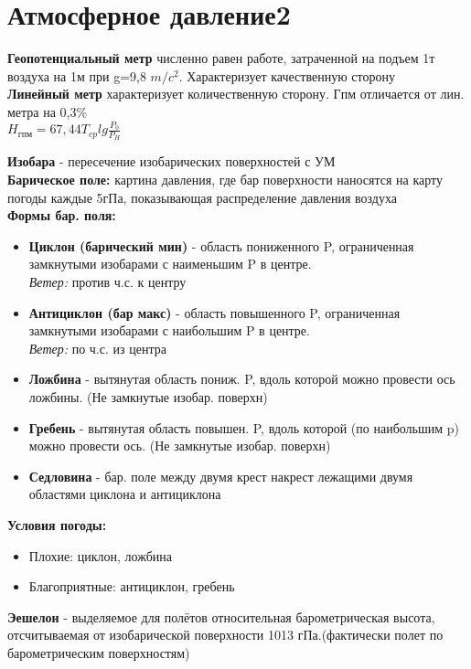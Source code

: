 
\section{Атмосферное давление2}
\par \textbf{Геопотенциальный метр} численно равен работе, затраченной на подъем 1т воздуха на 1м при g=9,8 $m/c^2$. Характеризует качественную сторону\\ 
\textbf{Линейный метр} характеризует количественную сторону. 
Гпм отличается от лин. метра на 0,3\%\\ 
$H_{\text{гпм}}=67,44T_{cp}lg\frac{P_{0}}{P_{H}}$	
\par \textbf{Изобара} - пересечение изобарических поверхностей с УМ \\
\textbf{Барическое поле:} картина давления, где бар поверхности наносятся на карту погоды каждые 5гПа, показывающая распределение давления воздуха\\
\textbf{Формы бар. поля:} 
\begin{itemize} 
	\item \textbf{Циклон (барический мин)} - область пониженного P, ограниченная замкнутыми изобарами с наименьшим P в центре.\\ 
	\textit{Ветер:} против ч.с. к центру
	\item \textbf{Антициклон (бар макс)} - область повышенного P, ограниченная замкнутыми изобарами с наибольшим P в центре.\\ 
	\textit{Ветер:} по ч.с. из центра 
	\item \textbf{Ложбина} - вытянутая область пониж. P, вдоль которой можно провести ось ложбины. (Не замкнутые изобар. поверхн) 
	\item \textbf{Гребень} - вытянутая область повышен. P, вдоль которой (по наибольшим p) можно провести ось. (Не замкнутые изобар. поверхн) 
	\item \textbf{Седловина} - бар. поле между двумя крест накрест лежащими двумя областями циклона и антициклона 
\end{itemize} 

\textbf{Условия погоды:} 
\begin{itemize} 
	\item[] Плохие: циклон, ложбина 
	\item[] Благоприятные: антициклон, гребень 
\end{itemize} 

\textbf{Эешелон} - выделяемое для полётов относительная барометрическая высота, отсчитываемая от изобарической поверхности 1013 гПа.(фактически полет по барометрическим поверхностям)

